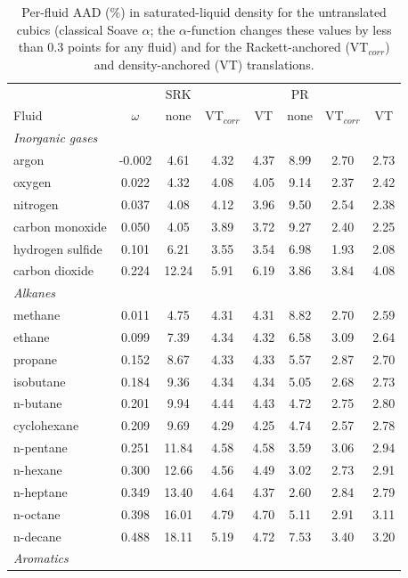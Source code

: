 \begin{table}[H]
\centering
\caption{Per-fluid AAD (\%) in saturated-liquid density for the untranslated cubics (classical Soave $\alpha$; the $\alpha$-function changes these values by less than 0.3 points for any fluid) and for the Rackett-anchored (VT$_{corr}$) and density-anchored (VT) translations.}
\label{tab:tabS_perfluid_rho}
\small
\begin{tabular}{lccccccc}
\toprule
 &  & SRK &  &  & PR &  &  \\
Fluid & $\omega$ & none & VT$_{corr}$ & VT & none & VT$_{corr}$ & VT \\
\midrule
\multicolumn{8}{l}{\emph{Inorganic gases}} \\
argon & -0.002 & 4.61 & 4.32 & 4.37 & 8.99 & 2.70 & 2.73 \\
oxygen & 0.022 & 4.32 & 4.08 & 4.05 & 9.14 & 2.37 & 2.42 \\
nitrogen & 0.037 & 4.08 & 4.12 & 3.96 & 9.50 & 2.54 & 2.38 \\
carbon monoxide & 0.050 & 4.05 & 3.89 & 3.72 & 9.27 & 2.40 & 2.25 \\
hydrogen sulfide & 0.101 & 6.21 & 3.55 & 3.54 & 6.98 & 1.93 & 2.08 \\
carbon dioxide & 0.224 & 12.24 & 5.91 & 6.19 & 3.86 & 3.84 & 4.08 \\
\multicolumn{8}{l}{\emph{Alkanes}} \\
methane & 0.011 & 4.75 & 4.31 & 4.31 & 8.82 & 2.70 & 2.59 \\
ethane & 0.099 & 7.39 & 4.34 & 4.32 & 6.58 & 3.09 & 2.64 \\
propane & 0.152 & 8.67 & 4.33 & 4.33 & 5.57 & 2.87 & 2.70 \\
isobutane & 0.184 & 9.36 & 4.34 & 4.34 & 5.05 & 2.68 & 2.73 \\
n-butane & 0.201 & 9.94 & 4.44 & 4.43 & 4.72 & 2.75 & 2.80 \\
cyclohexane & 0.209 & 9.69 & 4.29 & 4.25 & 4.74 & 2.57 & 2.78 \\
n-pentane & 0.251 & 11.84 & 4.58 & 4.58 & 3.59 & 3.06 & 2.94 \\
n-hexane & 0.300 & 12.66 & 4.56 & 4.49 & 3.02 & 2.73 & 2.91 \\
n-heptane & 0.349 & 13.40 & 4.64 & 4.37 & 2.60 & 2.84 & 2.79 \\
n-octane & 0.398 & 16.01 & 4.79 & 4.70 & 5.11 & 2.91 & 3.11 \\
n-decane & 0.488 & 18.11 & 5.19 & 4.72 & 7.53 & 3.40 & 3.20 \\
\multicolumn{8}{l}{\emph{Aromatics}} \\

\end{tabular}
\end{table}
